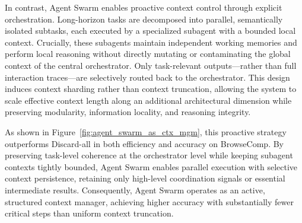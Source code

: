In contrast, Agent Swarm enables proactive context control through explicit orchestration. Long-horizon tasks are decomposed into parallel, semantically isolated subtasks, each executed by a specialized subagent with a bounded local context. Crucially, these subagents maintain independent working memories and perform local reasoning without directly mutating or contaminating the global context of the central orchestrator. Only task-relevant outputs—rather than full interaction traces—are selectively routed back to the orchestrator. This design induces context sharding rather than context truncation, allowing the system to scale effective context length along an additional architectural dimension while preserving modularity, information locality, and reasoning integrity.

As shown in Figure~\ref{fig:agent_swarm_as_ctx_mgm}, this proactive strategy outperforms Discard-all in both efficiency and accuracy on BrowseComp. By preserving task-level coherence at the orchestrator level while keeping subagent contexts tightly bounded, Agent Swarm enables parallel execution with selective context persistence, retaining only high-level coordination signals or essential intermediate results. Consequently, Agent Swarm operates as an active, structured context manager, achieving higher accuracy with substantially fewer critical steps than uniform context truncation.